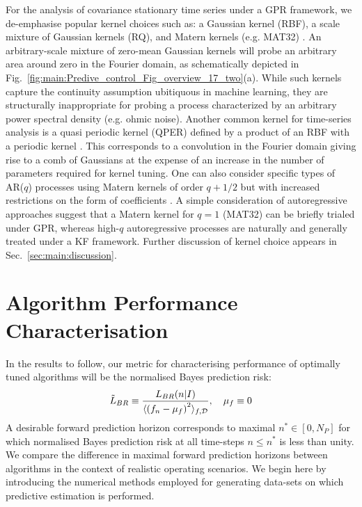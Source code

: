 For the analysis of covariance stationary time series under a GPR framework, we de-emphasise popular kernel choices such as: a Gaussian kernel (RBF),  a scale mixture of Gaussian kernels (RQ), and Matern kernels (e.g. MAT32) \cite{rasmussen2005gaussian,tobar2015learning}. An arbitrary-scale mixture of zero-mean Gaussian kernels will probe an arbitrary area around zero in the Fourier domain, as schematically depicted in Fig.~\ref{fig:main:Predive_control_Fig_overview_17_two}(a). While such kernels capture the continuity assumption ubitiquous in machine learning, they are structurally inappropriate for probing a process characterized by an arbitrary power spectral density (e.g. ohmic noise). Another common kernel for time-series analysis is a quasi periodic kernel (QPER) defined by a product of an RBF with a periodic kernel \cite{roberts2013gaussian}. This corresponds to a convolution in the Fourier domain giving rise to a comb of Gaussians at the expense of an increase in the number of parameters required for kernel tuning. One can also consider specific types of AR($q$) processes using Matern kernels of order $q+1/2$ but with increased restrictions on the form of coefficients \cite{rasmussen2005gaussian,stein2012interpolation}. A simple consideration of autoregressive approaches suggest that a Matern kernel for $q=1$ (MAT32) can be briefly trialed under GPR, whereas high-$q$ autoregressive processes are naturally and generally treated under a KF framework.  Further discussion of kernel choice appears in Sec.~\ref{sec:main:discussion}.

\section{Algorithm Performance Characterisation \label{sec:main:Performance}}

In the results to follow, our metric for characterising performance of optimally tuned algorithms will be the normalised Bayes prediction risk:
\begin{align}
	\tilde{L}_{BR} \equiv \frac{L_{BR}(n|I)}{\langle \left(f_n - \mu_f \right)^2 \rangle_{f, \mathcal{D}}}, \quad \mu_f \equiv 0
\end{align}
A desirable forward prediction horizon corresponds to maximal $n^* \in [0, N_P]$ for which normalised Bayes prediction risk at all time-steps $n \leq n^*$ is less than unity. We compare the difference in maximal forward prediction horizons between algorithms in the context of realistic operating scenarios.  We begin here by introducing the numerical methods employed for generating data-sets on which predictive estimation is performed.

